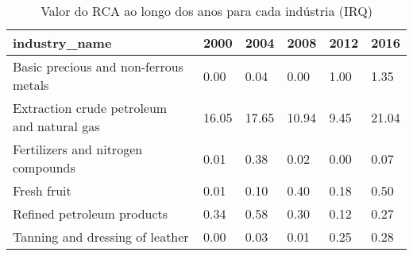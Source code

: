 \begin{table}
\centering
\caption{Valor do RCA ao longo dos anos para cada indústria (IRQ)}
\begin{tabular}{p{6cm}p{1.5cm}p{1.5cm}p{1.5cm}p{1.5cm}p{1.5cm}}
\toprule
                             industry\_name &  2000 &  2004 &  2008 & 2012 &  2016 \\
\midrule
     Basic precious and non-ferrous metals &  0.00 &  0.04 &  0.00 & 1.00 &  1.35 \\
Extraction crude petroleum and natural gas & 16.05 & 17.65 & 10.94 & 9.45 & 21.04 \\
        Fertilizers and nitrogen compounds &  0.01 &  0.38 &  0.02 & 0.00 &  0.07 \\
                               Fresh fruit &  0.01 &  0.10 &  0.40 & 0.18 &  0.50 \\
                Refined petroleum products &  0.34 &  0.58 &  0.30 & 0.12 &  0.27 \\
           Tanning and dressing of leather &  0.00 &  0.03 &  0.01 & 0.25 &  0.28 \\
\bottomrule
\end{tabular}
\end{table}
